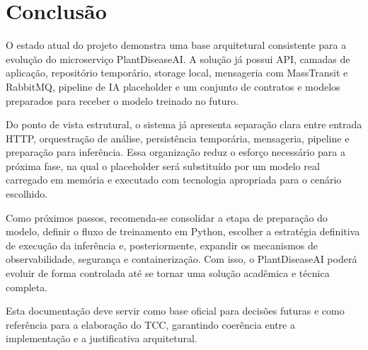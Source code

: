 \chapter{Conclusão}

O estado atual do projeto demonstra uma base arquitetural consistente para a evolução do microserviço PlantDiseaseAI. A solução já possui API, camadas de aplicação, repositório temporário, storage local, mensageria com MassTransit e RabbitMQ, pipeline de IA placeholder e um conjunto de contratos e modelos preparados para receber o modelo treinado no futuro.

Do ponto de vista estrutural, o sistema já apresenta separação clara entre entrada HTTP, orquestração de análise, persistência temporária, mensageria, pipeline e preparação para inferência. Essa organização reduz o esforço necessário para a próxima fase, na qual o placeholder será substituído por um modelo real carregado em memória e executado com tecnologia apropriada para o cenário escolhido.

Como próximos passos, recomenda-se consolidar a etapa de preparação do modelo, definir o fluxo de treinamento em Python, escolher a estratégia definitiva de execução da inferência e, posteriormente, expandir os mecanismos de observabilidade, segurança e containerização. Com isso, o PlantDiseaseAI poderá evoluir de forma controlada até se tornar uma solução acadêmica e técnica completa.

Esta documentação deve servir como base oficial para decisões futuras e como referência para a elaboração do TCC, garantindo coerência entre a implementação e a justificativa arquitetural.
